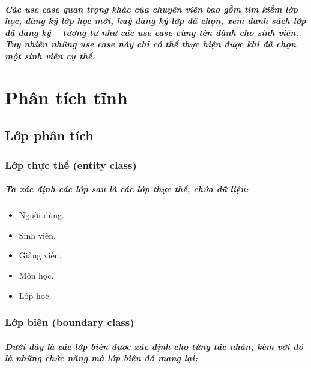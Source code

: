 \documentclass[12pt]{book}
\begin{document}
  \paragraph{\textnormal{
    Các use case quan trọng khác của chuyên viên bao gồm \textit{tìm kiếm lớp học}, \textit{đăng ký lớp học mới}, \textit{huỷ đăng ký lớp đã chọn}, \textit{xem danh sách lớp đã đăng ký} -- tương tự như các use case cùng tên dành cho \textit{sinh viên}. Tuy nhiên những use case này chỉ có thể thực hiện được khi đã chọn một sinh viên cụ thể.
  }}

\chapter{Phân tích tĩnh}

  \section{Lớp phân tích}

    \subsection{Lớp thực thể (entity class)}
    \paragraph{\textnormal{
      Ta xác định các lớp sau là các lớp thực thể, chứa dữ liệu:
    }}

    \begin{itemize}
      \item Người dùng.
      \item Sinh viên.
      \item Giảng viên.
      \item Môn học.
      \item Lớp học.
    \end{itemize}

    \subsection{Lớp biên (boundary class)}

      \paragraph{\textnormal{
        Dưới đây là các lớp biên được xác định cho từng tác nhân, kèm với đó là những chức năng mà lớp biên đó mang lại:
      }}
\end{document}
